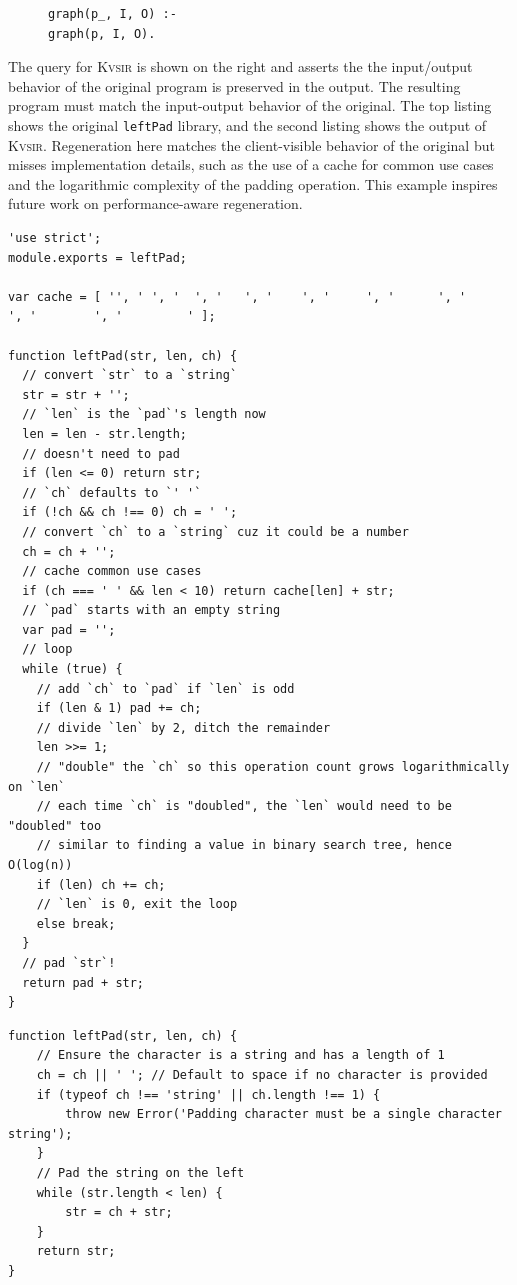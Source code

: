 \documentclass[nonacm,sigplan,review]{acmart}
\newcommand{\sys}{{\scshape Kv{\textalpha}sir}\xspace}
\newcommand{\ttt}[1]{\texttt{#1}\xspace}
\begin{document}
\begin{figure}
\begin{verbatim}
graph(p_, I, O) :-
graph(p, I, O).
\end{verbatim}
\end{figure}
The query for \sys is shown on the right and asserts the the input/output behavior of the
original program is preserved in the output.
The resulting program must match the input-output behavior of the original.
The top listing shows the original \ttt{leftPad} library, and the second listing shows the output
of \sys.
Regeneration here matches the client-visible behavior of the original but misses
implementation details, such as the use of a cache for common
use cases and the logarithmic complexity of the padding operation.
This example inspires future work on performance-aware regeneration.

\begin{listing}[htpb]
\begin{verbatim}
'use strict';
module.exports = leftPad;

var cache = [ '', ' ', '  ', '   ', '    ', '     ', '      ', '       ', '        ', '         ' ];

function leftPad(str, len, ch) {
  // convert `str` to a `string`
  str = str + '';
  // `len` is the `pad`'s length now
  len = len - str.length;
  // doesn't need to pad
  if (len <= 0) return str;
  // `ch` defaults to `' '`
  if (!ch && ch !== 0) ch = ' ';
  // convert `ch` to a `string` cuz it could be a number
  ch = ch + '';
  // cache common use cases
  if (ch === ' ' && len < 10) return cache[len] + str;
  // `pad` starts with an empty string
  var pad = '';
  // loop
  while (true) {
    // add `ch` to `pad` if `len` is odd
    if (len & 1) pad += ch;
    // divide `len` by 2, ditch the remainder
    len >>= 1;
    // "double" the `ch` so this operation count grows logarithmically on `len`
    // each time `ch` is "doubled", the `len` would need to be "doubled" too
    // similar to finding a value in binary search tree, hence O(log(n))
    if (len) ch += ch;
    // `len` is 0, exit the loop
    else break;
  }
  // pad `str`!
  return pad + str;
}
  \end{verbatim}
\caption{The original \ttt{leftPad} library.}
\end{listing}

\begin{listing}[htpb]
  \begin{verbatim}
function leftPad(str, len, ch) {
    // Ensure the character is a string and has a length of 1
    ch = ch || ' '; // Default to space if no character is provided
    if (typeof ch !== 'string' || ch.length !== 1) {
        throw new Error('Padding character must be a single character string');
    }
    // Pad the string on the left
    while (str.length < len) {
        str = ch + str;
    }
    return str;
}
  \end{verbatim}
  \caption{The output of \sys, having regenerated \ttt{leftPad}.}
\end{listing}
\end{document}
